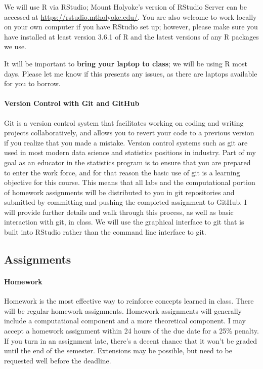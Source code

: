 \documentclass[11pt]{article}
\begin{document}
We will use R via RStudio; Mount Holyoke's version of RStudio Server can be accessed at \url{https://rstudio.mtholyoke.edu/}.  You are also welcome to work locally on your own computer if you have RStudio set up; however, please make sure you have installed at least version 3.6.1 of R and the latest versions of any R packages we use.

It will be important to \textbf{bring your laptop to class}; we will be using R most days.  Please let me know if this presents any issues, as there are laptops available for you to borrow.

\paragraph{Version Control with Git and GitHub}

Git is a version control system that facilitates working on coding and writing projects collaboratively, and allows you to revert your code to a previous version if you realize that you made a mistake.  Version control systems such as git are used in most modern data science and statistics positions in industry.  Part of my goal as an educator in the statistics program is to ensure that you are prepared to enter the work force, and for that reason the basic use of git is a learning objective for this course.  This means that all labs and the computational portion of homework assignments will be distributed to you in git repositories and submitted by committing and pushing the completed assignment to GitHub.  I will provide further details and walk through this process, as well as basic interaction with git, in class.  We will use the graphical interface to git that is built into RStudio rather than the command line interface to git.

\subsection*{Assignments}

\paragraph{Homework}
Homework is the most effective way to reinforce concepts learned in class. There will be regular homework assignments. Homework assignments will generally include a computational component and a more theoretical component. I may accept a homework assignment within 24 hours of the due date for a 25\% penalty. If you turn in an assignment late, there's a decent chance that it won't be graded until the end of the semester. Extensions may be possible, but need to be requested well before the deadline.
\end{document}
